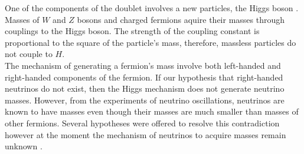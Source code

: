 One of the components of the doublet involves a new particles, the Higgs boson \cite{ref_Pich}. Masses of $W$ and $Z$ bosons and charged fermions aquire their masses through couplings to the Higgs boson. The strength of the coupling constant is proportional to the square of the particle's mass, therefore, massless particles do not couple to $H$.\\

The mechanism of generating a fermion's mass involve both left-handed and right-handed components of the fermion. If our hypothesis that right-handed neutrinos do not exist, then the Higgs mechanism does not generate neutrino masses. However, from the experiments of neutrino oscillations, neutrinos are known to have masses even though their masses are much smaller than masses of other fermions. Several hypotheses were offered to resolve this contradiction however at the moment the mechanism of neutrinos to acquire masses remain unknown \cite{ref_PDG}.\\

